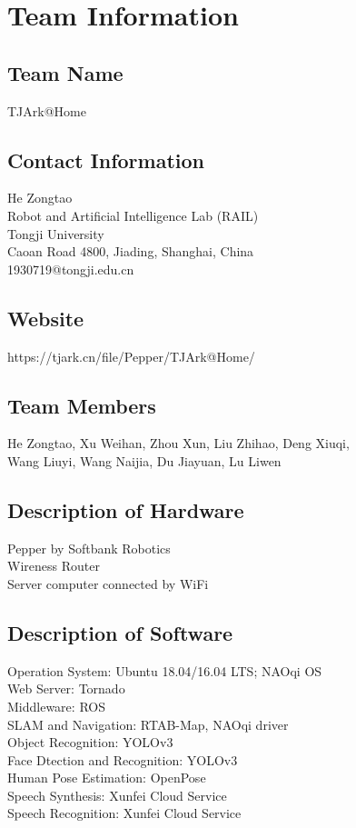 \section{Team Information}
\label{sec:team}

\subsection*{Team Name}
TJArk@Home

\subsection*{Contact Information}
He Zongtao \\
Robot and Artificial Intelligence Lab (RAIL) \\
Tongji University \\
Caoan Road 4800, Jiading, Shanghai, China \\
1930719@tongji.edu.cn 

\subsection*{Website}
https://tjark.cn/file/Pepper/TJArk@Home/

\subsection*{Team Members}
He Zongtao, Xu Weihan, Zhou Xun, Liu Zhihao, Deng Xiuqi, \\
Wang Liuyi, Wang Naijia, Du Jiayuan, Lu Liwen

\subsection*{Description of Hardware}
Pepper by Softbank Robotics \\
Wireness Router \\
Server computer connected by WiFi \\

\subsection*{Description of Software}
Operation System: Ubuntu 18.04/16.04 LTS; NAOqi OS \\
Web Server: Tornado \\
Middleware: ROS \\
SLAM and Navigation: RTAB-Map, NAOqi driver \\
Object Recognition: YOLOv3 \\
Face Dtection and Recognition: YOLOv3 \\
Human Pose Estimation:  OpenPose \\
Speech Synthesis: Xunfei Cloud Service\\
Speech Recognition: Xunfei Cloud Service \\
